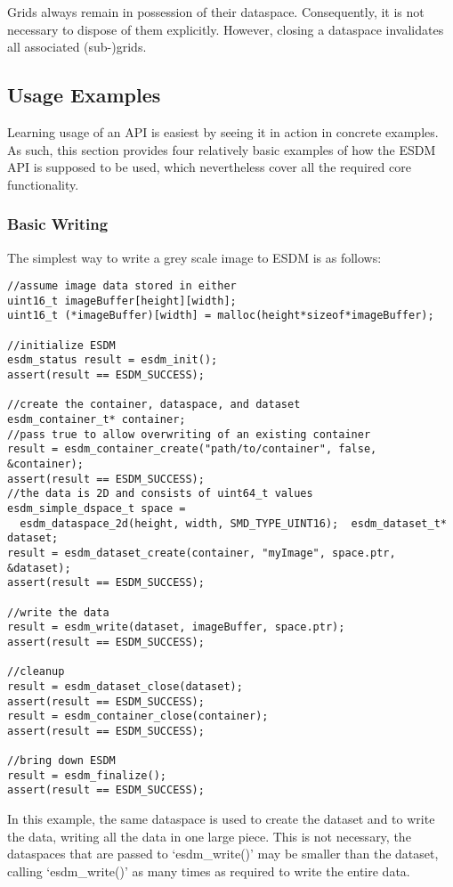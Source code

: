 Grids always remain in possession of their dataspace. Consequently, it
is not necessary to dispose of them explicitly. However, closing a
dataspace invalidates all associated (sub-)grids.

\subsection{Usage Examples}

Learning usage of an API is easiest by seeing it in action in concrete
examples. As such, this section provides four relatively basic examples
of how the ESDM API is supposed to be used, which nevertheless cover all
the required core functionality.

\subsubsection{Basic Writing}

The simplest way to write a grey scale image to ESDM is as follows:


\begin{lstlisting}
//assume image data stored in either
uint16_t imageBuffer[height][width];
uint16_t (*imageBuffer)[width] = malloc(height*sizeof*imageBuffer);

//initialize ESDM
esdm_status result = esdm_init();
assert(result == ESDM_SUCCESS);

//create the container, dataspace, and dataset
esdm_container_t* container;
//pass true to allow overwriting of an existing container
result = esdm_container_create("path/to/container", false, &container); 
assert(result == ESDM_SUCCESS);
//the data is 2D and consists of uint64_t values
esdm_simple_dspace_t space = 
  esdm_dataspace_2d(height, width, SMD_TYPE_UINT16);  esdm_dataset_t* dataset;
result = esdm_dataset_create(container, "myImage", space.ptr, &dataset);
assert(result == ESDM_SUCCESS);

//write the data
result = esdm_write(dataset, imageBuffer, space.ptr);
assert(result == ESDM_SUCCESS);

//cleanup
result = esdm_dataset_close(dataset);
assert(result == ESDM_SUCCESS);
result = esdm_container_close(container);
assert(result == ESDM_SUCCESS);

//bring down ESDM
result = esdm_finalize();
assert(result == ESDM_SUCCESS);
\end{lstlisting}

In this example, the same dataspace is used to create the dataset and to
write the data, writing all the data in one large piece. This is not
necessary, the dataspaces that are passed to `esdm\_write()' may be
smaller than the dataset, calling `esdm\_write()' as many times as
required to write the entire data.

